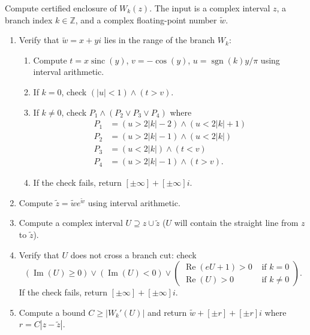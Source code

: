 \documentclass[11pt,a4paper]{article}
\begin{document}
\begin{algorithm}
\caption{Compute certified enclosure of $W_k(z)$. The input is a complex interval $z$, a branch index $k \in \mathbb{Z}$, and a complex floating-point number $\tilde w$.}
\begin{enumerate}
\setlength{\itemsep}{-3pt}
\setlength{\parskip}{3pt}
\setlength{\parsep}{-3pt}
\item Verify that $\tilde w = x+yi$ lies in the range of the branch $W_k$:
\begin{enumerate}
\setlength{\itemsep}{-3pt}
\setlength{\parskip}{3pt}
\setlength{\parsep}{-3pt}
\item Compute $t = x \operatorname{sinc}(y)$, $v = -\cos(y)$, $u = \operatorname{sgn}(k) y / \pi$ using interval arithmetic.
\item If $k = 0$, check $(|u| < 1) \land (t > v)$.
\item If $k \ne 0$, check $P_1 \land (P_2 \lor P_3 \lor P_4)$ where
\begin{align*}
P_1 &= (u > 2|k|-2) \land (u < 2|k|+1) \\
P_2 &= (u > 2|k|-1) \land (u < 2|k|) \\ 
P_3 &= (u < 2|k|) \land (t < v) \\
P_4 &= (u > 2|k|-1) \land (t > v).
\end{align*}
\item If the check fails, return $[\pm \infty] + [\pm \infty] i$.
\end{enumerate}
\item Compute $\tilde z = \tilde w e^{\tilde w}$ using interval arithmetic.
\item Compute a complex interval $U \supseteq z \cup \tilde z$ ($U$ will contain the straight line from $z$ to $\tilde z$).
\item Verify that $U$ does not cross a branch cut: check
\begin{equation*}
(\operatorname{Im}(U) \ge 0) \lor (\operatorname{Im}(U) < 0) \lor
\left(
\begin{matrix}
\operatorname{Re}(e U + 1) > 0 & \text{ if } k = 0 \\
\operatorname{Re}(U) > 0 & \text{ if } k \ne 0
\end{matrix}
\right).
\end{equation*}
If the check fails, return $[\pm \infty] + [\pm \infty] i$.
\item Compute a bound $C \ge |W_k'(U)|$ and return $\tilde w + [\pm r] + [\pm r] i$ where $r = C |z - \tilde z|$.
\end{enumerate}
\label{alg:certify}
\end{algorithm}
\end{document}
